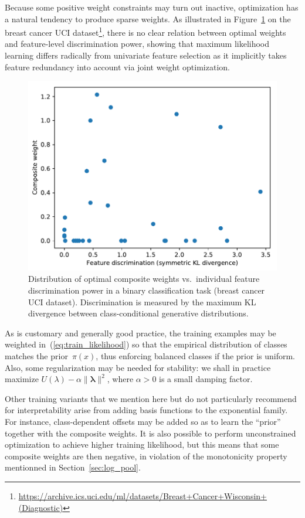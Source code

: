 \documentclass[english]{scrartcl}
\newcommand{\blambda}{{\boldsymbol{\lambda}}}
\begin{document}
Because some positive weight constraints may turn out inactive, optimization has a natural tendency to produce sparse weights. As illustrated in Figure~\ref{fig:disc_weight_plot} on the breast cancer UCI dataset\footnote{\url{https://archive.ics.uci.edu/ml/datasets/Breast+Cancer+Wisconsin+(Diagnostic)}}, there is no clear relation between optimal weights and feature-level discrimination power, showing that maximum likelihood learning differs radically from univariate feature selection as it implicitly takes feature redundancy into account via joint weight optimization.

\begin{figure}[!ht]
  \begin{center}
    \includegraphics[width=.6\textwidth]{disc_weight_plot.pdf}
  \end{center}
\caption{Distribution of optimal composite weights vs.~individual feature discrimination power in a binary classification task (breast cancer UCI dataset). Discrimination is measured by the maximum KL divergence between class-conditional generative distributions.}
\label{fig:disc_weight_plot}
\end{figure}

As is customary and generally good practice, the training examples may be weighted in~(\ref{eq:train_likelihood}) so that the empirical distribution of classes matches the prior~$\pi(x)$, thus enforcing balanced classes if the prior is uniform. Also, some regularization may be needed for stability: we shall in practice maximize $U(\lambda)-\alpha \|\blambda\|^2$, where $\alpha>0$ is a small damping factor.

Other training variants that we mention here but do not particularly recommend for interpretability arise from adding basis functions to the exponential family. For instance, class-dependent offsets may be added so as to learn the ``prior'' together with the composite weights. It is also possible to perform unconstrained optimization to achieve higher training likelihood, but this means that some composite weights are then negative, in violation of the monotonicity property mentionned in Section~\ref{sec:log_pool}.
\end{document}
